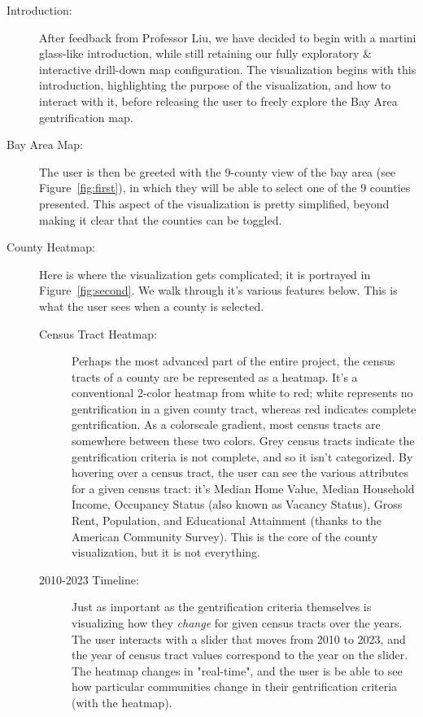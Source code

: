 \documentclass{article}
\begin{document}
\begin{description}

    \item[Introduction:] After feedback from Professor Liu, we have decided to begin with a martini glass-like introduction, while still retaining our fully exploratory \& interactive drill-down map configuration. The visualization begins with this introduction, highlighting the purpose of the visualization, and how to interact with it, before releasing the user to freely explore the Bay Area gentrification map.
    
    \item[Bay Area Map:] The user is then be greeted with the 9-county view of the bay area (see Figure~\ref{fig:first}), in which they will be able to select one of the 9 counties presented. This aspect of the visualization is pretty simplified, beyond making it clear that the counties can be toggled.
    
    \item[County Heatmap:] Here is where the visualization gets complicated; it is portrayed in Figure~\ref{fig:second}. We walk through it's various features below. This is what the user sees when a county is selected.
    
    \begin{description}
    
        \item[Census Tract Heatmap:] Perhaps the most advanced part of the entire project, the census tracts of a county are be represented as a heatmap. It's a conventional 2-color heatmap from white to red; white represents no gentrification in a given county tract, whereas red indicates complete gentrification. As a colorscale gradient, most census tracts are somewhere between these two colors. Grey census tracts indicate the gentrification criteria is not complete, and so it isn't categorized. By hovering over a census tract, the user can see the various attributes for a given census tract: it's Median Home Value, Median Household Income, Occupancy Status (also known as Vacancy Status), Gross Rent, Population, and Educational Attainment (thanks to the American Community Survey). This is the core of the county visualization, but it is not everything.  
        
        \item[2010-2023 Timeline:] Just as important as the gentrification criteria themselves is visualizing how they \textit{change} for given census tracts over the years. The user interacts with a slider that moves from 2010 to 2023, and the year of census tract values correspond to the year on the slider. The heatmap changes in "real-time", and the user is be able to see how particular communities change in their gentrification criteria (with the heatmap).
        

\end{description}
\end{description}
\end{document}
